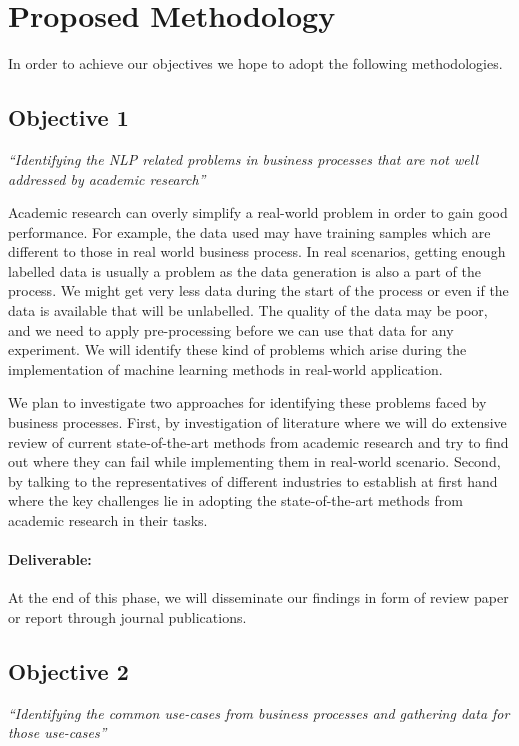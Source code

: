 \section{Proposed Methodology}\label{sec:methods}
In order to achieve our objectives we hope to adopt the following methodologies.

\subsection[Objective 1]{Objective 1}
\textit{``Identifying the NLP related problems in business processes that are not well addressed by academic research''}

\vspace{12pt}
\noindent Academic research can overly simplify a real-world problem in order to gain good performance. For example, the data used may have training samples which are different to those in real world business process. In real scenarios, getting enough labelled data is usually a problem as the data generation is also a part of the process. We might get very less data during the start of the process or even if the data is available that will be unlabelled. The quality of the data may be poor, and we need to apply pre-processing before we can use that data for any experiment. We will identify these kind of problems which arise during the implementation of machine learning methods in real-world application. 

We plan to investigate two approaches for identifying these problems faced by business processes. First, by investigation of literature where we will do extensive review of current state-of-the-art methods from academic research and try to find out where they can fail while implementing them in real-world scenario. Second, by talking to the representatives of different industries to establish at first hand where the key challenges lie in adopting the state-of-the-art methods from academic research in their tasks.

\paragraph{Deliverable:} At the end of this phase, we will disseminate our findings in form of review paper or report through journal publications.

\subsection{Objective 2}
\textit{``Identifying the common use-cases from business processes and gathering data for those use-cases''}

